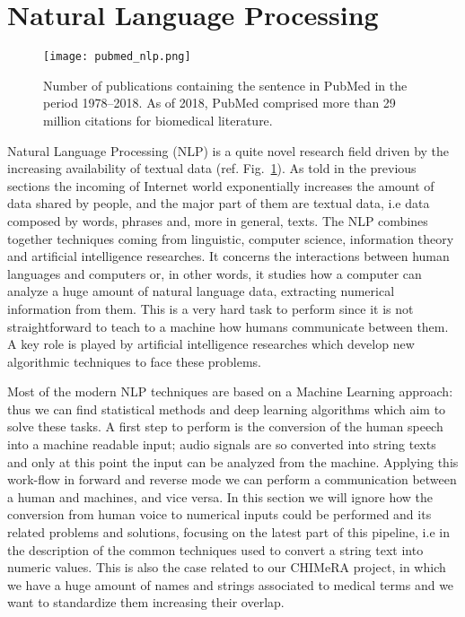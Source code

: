 \documentclass{standalone}
\begin{document}
\section[NLP]{Natural Language Processing}\label{chimera:nlp}

\begin{center}
\begin{figure}[htbp]
\centering
\texttt{[image: pubmed\_nlp.png]}
\caption{Number of publications containing the sentence  in PubMed in the period 1978–2018.
As of 2018, PubMed comprised more than 29 million citations for biomedical literature.
}
\label{fig:pubmed_nlp}
\end{figure}
\end{center}

Natural Language Processing (NLP) is a quite novel research field driven by the increasing availability of textual data (ref. Fig.~\ref{fig:pubmed_nlp}).
As told in the previous sections the incoming of Internet world exponentially increases the amount of data shared by people, and the major part of them are textual data, i.e data composed by words, phrases and, more in general, texts.
The NLP combines together techniques coming from linguistic, computer science, information theory and artificial intelligence researches.
It concerns the interactions between human languages and computers or, in other words, it studies how a computer can analyze a huge amount of natural language data, extracting numerical information from them.
This is a very hard task to perform since it is not straightforward to teach to a machine how humans communicate between them.
A key role is played by artificial intelligence researches which develop new algorithmic techniques to face these problems.

Most of the modern NLP techniques are based on a Machine Learning approach: thus we can find statistical methods and deep learning algorithms which aim to solve these tasks.
A first step to perform is the conversion of the human speech into a machine readable input; audio signals are so converted into string texts and only at this point the input can be analyzed from the machine.
Applying this work-flow in forward and reverse mode we can perform a communication between a human and machines, and vice versa.
In this section we will ignore how the conversion from human voice to numerical inputs could be performed and its related problems and solutions, focusing on the latest part of this pipeline, i.e in the description of the common techniques used to convert a string text into numeric values.
This is also the case related to our \textsf{CHIMeRA} project, in which we have a huge amount of names and strings associated to medical terms and we want to standardize them increasing their overlap.
\end{document}
